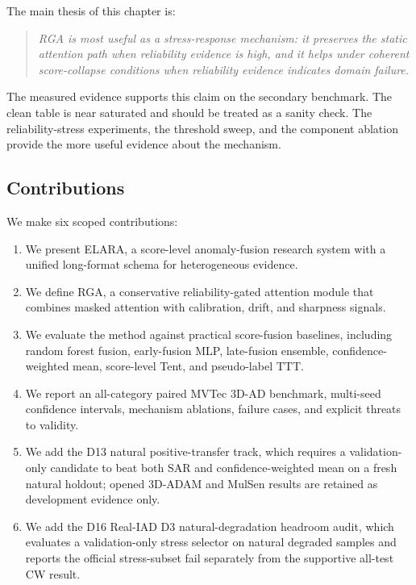 \documentclass[11pt]{article}
\newcommand{\system}{ELARA}
\newcommand{\method}{RGA}
\begin{document}
The main thesis of this chapter is:

\begin{quote}
\emph{\method{} is most useful as a stress-response mechanism: it preserves the
static attention path when reliability evidence is high, and it helps under
coherent score-collapse conditions when reliability evidence indicates domain
failure.}
\end{quote}

The measured evidence supports this claim on the secondary
benchmark. The clean table is near saturated and should be treated as a sanity
check. The reliability-stress experiments, the threshold sweep, and the
component ablation provide the more useful evidence about the mechanism.

\subsection{Contributions}

We make six scoped contributions:

\begin{enumerate}
  \item We present \system{}, a score-level anomaly-fusion research system
  with a unified long-format schema for heterogeneous evidence.
  \item We define \method{}, a conservative reliability-gated attention module
  that combines masked attention with calibration, drift, and sharpness signals.
  \item We evaluate the method against practical score-fusion baselines,
  including random forest fusion, early-fusion MLP, late-fusion ensemble,
  confidence-weighted mean, score-level Tent, and pseudo-label TTT.
  \item We report an all-category paired MVTec 3D-AD benchmark, multi-seed
  confidence intervals, mechanism ablations, failure cases, and explicit
  threats to validity.
  \item We add the D13 natural positive-transfer track, which requires a
  validation-only candidate to beat both SAR and confidence-weighted mean on a
  fresh natural holdout; opened 3D-ADAM and MulSen results are retained as
  development evidence only.
  \item We add the D16 Real-IAD D3 natural-degradation headroom audit, which
  evaluates a validation-only stress selector on natural degraded samples and
  reports the official stress-subset fail separately from the supportive
  all-test CW result.
\end{enumerate}
\end{document}
